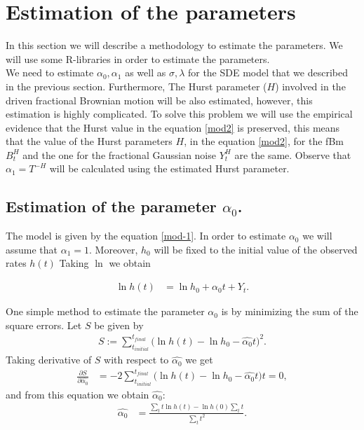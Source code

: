 \documentclass[smallextended]{svjour3}
\begin{document}
\section{Estimation of the parameters}
\label{esti}

In this section we will describe a methodology to estimate the parameters.
We will use some R-libraries in order to estimate the parameters. \\

We need to estimate $\alpha_0, \alpha_1$ as well as $\sigma,\lambda$ for the
SDE model that we described in the previous section. Furthermore,
The Hurst parameter ($H$) involved in the driven fractional Brownian motion
will be also estimated, however, this estimation is highly complicated.
To solve this problem we will use the empirical evidence that the Hurst value
in the equation \eqref{mod2}
is preserved, this means that the  value of the  Hurst parameters $H$, in the
equation \eqref{mod2}, for the fBm $B_t^H$ and the one for the
fractional Gaussian noise $Y_t^H$ are the same. Observe that $\alpha_1=T^{-H}$
will be calculated using the estimated Hurst parameter.

\subsection{Estimation of the parameter $\alpha_0$.}


The model is given by the equation \eqref{mod-1}. In order to estimate
$\alpha_0$ we will assume that $\alpha_1=1$. Moreover, $h_0$ will be fixed to
the initial value of the observed rates $h(t)$ Taking $\ln$ we obtain

\begin{align}
\ln h(t)&=\ln h_0+\alpha_0t+Y_t. \label{mod-ln}
\end{align}

One simple method to estimate the parameter $\alpha_0$ is by minimizing the sum
of the square errors.
Let $S$ be given by
\begin{align*}
S:= \sum_{t_{initial}}^{t_{final}} \Big( \ln h(t)-\ln h_0-\widehat{\alpha_0} t
\Big)^2. %
\end{align*}
Taking derivative of $S$ with respect
to $\widehat{\alpha_0}$  we get
\begin{align*}
\frac{\partial S}{\partial \widehat{\alpha_0}}&=
-2\sum_{t_{initial}}^{t_{final}} \Big( \ln h(t)-\ln h_0-\widehat{\alpha_0} t
\Big) t =0, %
\end{align*}
and from this equation we obtain $\widehat{\alpha_0}$:
\begin{align}
\widehat{\alpha_0} &= \frac{\sum_{t} t\ln h(t) - \ln h(0)\sum_{t} t}{\sum_{t}
t^2}. \label{alpha0}
\end{align}
\end{document}
